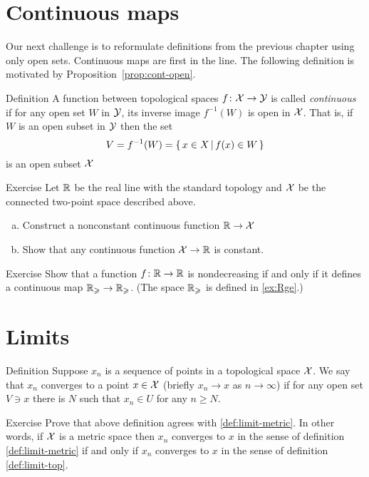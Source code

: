 \section{Continuous maps}

Our next challenge is to reformulate definitions from the previous chapter using only open sets.
Continuous maps are first in the line.
The following definition is motivated by Proposition~\ref{prop:cont-open}.

\begin{thm}{Definition}\label{def:cont-top}
A function between topological spaces 
$f\colon\mathcal{X}\to\mathcal{Y}$ is called \emph{continuous} if for any open set $W$ in $\mathcal{Y}$, its inverse image $f^{-1}(W)$ is open in $\mathcal{X}$.
That is, if $W$ is an open subset in $\mathcal{Y}$ then the set
\[V=f^{-1}(W)=\left\{\,{x\in X}\,\middle|\,{f(x)\in W}\,\right\}\]
is an open subset $\mathcal{X}$
\end{thm}

\begin{thm}{Exercise}
Let $\mathbb{R}$ be the real line with the standard topology
and $\mathcal{X}$ be the connected two-point space described above.
\begin{enumerate}[(a)]
\item Construct a nonconstant continuous function $\mathbb{R}\to \mathcal{X}$
\item Show that any continuous function $\mathcal{X}\to \mathbb{R}$ is constant.
\end{enumerate}

\end{thm}

\begin{thm}{Exercise} 
Show that a function $f\colon\mathbb{R}\to\mathbb{R}$ is nondecreasing if and only if it defines a continuous map $\mathbb{R}_\geqslant\to \mathbb{R}_\geqslant$.
(The space $\mathbb{R}_\geqslant$ is defined in \ref{ex:Rge}.)
\end{thm}

\section{Limits}

\begin{thm}{Definition}\label{def:limit-top}
Suppose $x_n$ is a sequence of points in a topological space $\mathcal{X}$.
We say that $x_n$ converges to a point $x\in \mathcal{X}$ (briefly $x_n\to x$ as $n\to\infty$) if for any open set $V\ni x$ there is $N$ such that 
$x_n\in U$ for any $n\ge N$.
\end{thm}

\begin{thm}{Exercise}
Prove that above definition agrees with \ref{def:limit-metric}.
In other words, if $\mathcal{X}$ is a metric space then $x_n$ converges to $x$ in the sense of definition \ref{def:limit-metric} if and only if $x_n$ converges to $x$ in the sense of definition \ref{def:limit-top}.
\end{thm}

